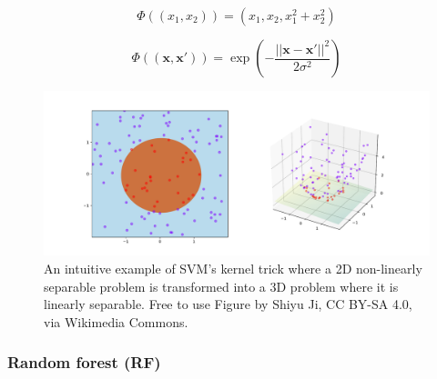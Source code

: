 \begin{equation}
    \label{eq:processing_signals_svm_kernel_function}
    \Phi ((x_1, x_2)) = (x_1, x_2, x_1^2 + x_2^2)
\end{equation}

\begin{equation}
    \label{eq:processing_signals_svm_rbf}
    \Phi ((\mathbf{x}, \mathbf{x}')) = \exp(- \frac{|| \mathbf{x} - \mathbf{x}' ||^2}{2 \sigma^2} )
\end{equation}

\begin{figure}[t]
    \centering
    \includegraphics[width=\linewidth]{../images/pipeline/svm_kernel_trick.pdf}
    \captionsetup{width=0.8\linewidth}
    \captionsetup{justification=centering}
    \caption{An intuitive example of SVM's kernel trick where a 2D non-linearly separable problem is transformed into a 3D problem where it is linearly separable. Free to use Figure by Shiyu Ji, CC BY-SA 4.0, via Wikimedia Commons.}
    \label{fig:processing_signals_svm_kernel}
\end{figure}


\subsubsection{Random forest (RF)}
\label{subsubsec:processing_signals_ml_and_dl_ml_classifiers_rf}

